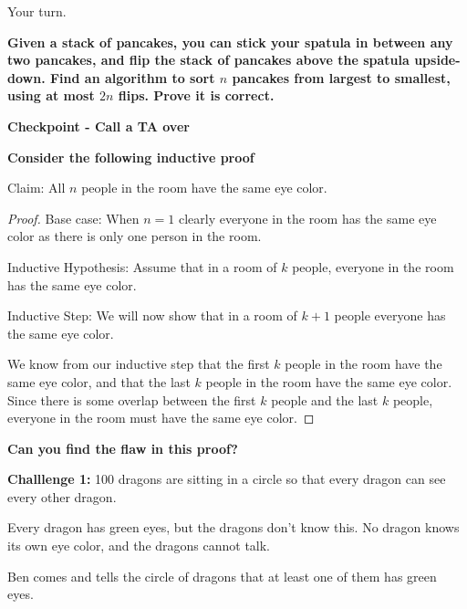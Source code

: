 \documentclass[12pt,letterpaper]{article}
\newif\ifsol
\newcommand{\solu}[2]{ \begin{mdframed} \ifsol #2 \else \vspace{#1} \fi \end{mdframed} }
\begin{document}
Your turn.

\textbf{Given a stack of pancakes, you can stick your spatula in between any two
pancakes, and flip the stack of pancakes above the spatula upside-down. Find an algorithm
to sort $n$ pancakes from largest to smallest, using at most $2n$ flips. Prove it is correct.}

\solu{18cm}{The algorithm is to always find the largest pancake, flip it to the top, then flip the whole stack so the largest pancake is on the bottom. After this proceed recursively on all but the largest pancake. The proof for why this is correct is identical to the proof for $SORT$ given above.}

\textbf{Checkpoint - Call a TA over}

\pagebreak

\textbf{Consider the following inductive proof}



Claim: All $n$ people in the room have the same eye color.
\begin{proof} 

Base case: When $n=1$ clearly everyone in the room has the same eye color as there is only one person in the room.

Inductive Hypothesis: Assume that in a room of $k$ people, everyone in the room has the same eye color.

Inductive Step: We will now show that in a room of $k+1$ people everyone has the same eye color.

We know from our inductive step that the first $k$ people in the room have the same eye color, and that the last $k$ people in the room have the same eye color. Since there is some overlap between the first $k$ people and the last $k$ people, everyone in the room must have the same eye color.
\end{proof}

\textbf{Can you find the flaw in this proof?}

\solu{10cm}{The inductive step does not work for 2 people.}

\pagebreak

\textbf{Challlenge 1:}
100 dragons are sitting in a circle so that every dragon can see every other dragon.

Every dragon has green eyes, but the dragons don't know this. No dragon knows its own eye color, and the dragons cannot talk.

Ben comes and tells the circle of dragons that at least one of them has green eyes. 
\end{document}
